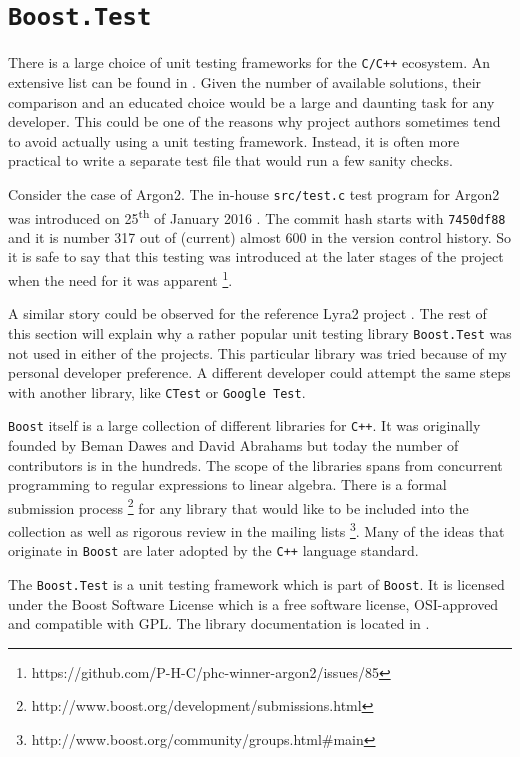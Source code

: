 \section{\texttt{Boost.Test}}
\label{sec:unit-boost-google}

There is a large choice of unit testing frameworks for the \texttt{C/C++} ecosystem. An extensive list can be found in \cite{wiki:2017:frameworks-c, wiki:2017:frameworks-cpp}. Given the number of available solutions, their comparison and an educated choice would be a large and daunting task for any developer. This could be one of the reasons why project authors sometimes tend to avoid actually using a unit testing framework. Instead, it is often more practical to write a separate test file that would run a few sanity checks.

Consider the case of Argon2. The in-house \texttt{src/test.c} test program for Argon2 was introduced on 25\textsuperscript{th} of January 2016 \cite{github:2017:argon2}. The commit hash starts with \texttt{7450df88} and it is number 317 out of (current) almost 600 in the version control history. So it is safe to say that this testing was introduced at the later stages of the project when the need for it was apparent \footnote{https://github.com/P-H-C/phc-winner-argon2/issues/85}.

A similar story could be observed for the reference Lyra2 project \cite{github:2017:lyra}. The rest of this section will explain why a rather popular unit testing library \texttt{Boost.Test} was not used in either of the projects. This particular library was tried because of my personal developer preference. A different developer could attempt the same steps with another library, like \texttt{CTest} or \texttt{Google Test}.

\texttt{Boost} itself is a large collection of different libraries for \texttt{C++}. It was originally founded by Beman Dawes and David Abrahams but today the number of contributors is in the hundreds. The scope of the libraries spans from concurrent programming to regular expressions to linear algebra. There is a formal submission process \footnote{http://www.boost.org/development/submissions.html} for any library that would like to be included into the collection as well as rigorous review in the mailing lists \footnote{http://www.boost.org/community/groups.html\#main}. Many of the ideas that originate in \texttt{Boost} are later adopted by the \texttt{C++} language standard.

The \texttt{Boost.Test} is a unit testing framework which is part of \texttt{Boost}. It is licensed under the Boost Software License which is a free software license, OSI-approved and compatible with GPL. The library documentation is located in \cite{boost:2017:test-docs}.

